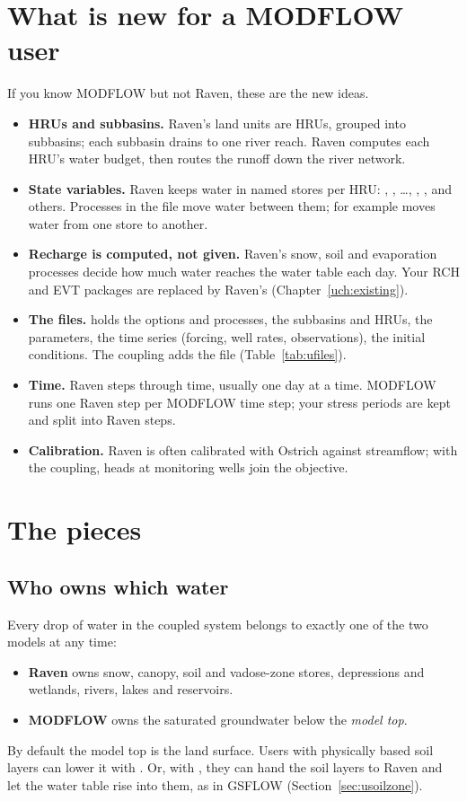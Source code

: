 \section{What is new for a MODFLOW user}\label{sec:newmodflow}
If you know MODFLOW but not Raven, these are the new ideas.
\begin{itemize}
\item \textbf{HRUs and subbasins.} Raven's land units are HRUs, grouped into subbasins; each subbasin drains to one river
reach. Raven computes each HRU's water budget, then routes the runoff down the river network.
\item \textbf{State variables.} Raven keeps water in named stores per HRU: , , \dots,
, ,  and others. Processes in the  file move water between
them; for example  moves water from one store to
another.
\item \textbf{Recharge is computed, not given.} Raven's snow, soil and evaporation processes decide how much water
reaches the water table each day. Your RCH and EVT packages are replaced by Raven's (Chapter~\ref{uch:existing}).
\item \textbf{The files.}  holds the options and processes,  the subbasins and HRUs,  the
parameters,  the time series (forcing, well rates, observations),  the initial conditions. The
coupling adds the  file (Table~\ref{tab:ufiles}).
\item \textbf{Time.} Raven steps through time, usually one day at a time. MODFLOW runs one Raven step per MODFLOW time
step; your stress periods are kept and split into Raven steps.
\item \textbf{Calibration.} Raven is often calibrated with Ostrich against streamflow; with the coupling, heads at
monitoring wells join the objective.
\end{itemize}

\section{The pieces}\label{ch:overview}
\subsection{Who owns which water}
Every drop of water in the coupled system belongs to exactly one of the two models at any time:
\begin{itemize}
\item \textbf{Raven} owns snow, canopy, soil and vadose-zone stores, depressions and wetlands, rivers, lakes and
reservoirs.
\item \textbf{MODFLOW} owns the saturated groundwater below the \emph{model top}.
\end{itemize}
By default the model top is the land surface. Users with physically based soil layers can lower it with
. Or, with , they can hand the soil layers to Raven and let the water table
rise into them, as in GSFLOW \cite{markstrom2008gsflow} (Section~\ref{sec:usoilzone}).

